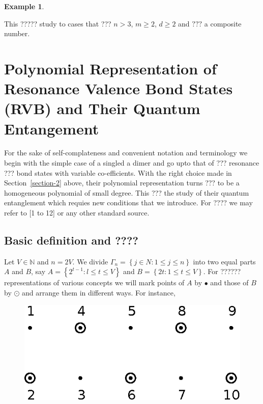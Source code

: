\documentclass[a4paper,12pt]{article}
\theoremstyle{definition}
\theoremstyle{underlinethm}
\newtheorem{example}{Example}[section]
\theoremstyle{definition}
\begin{document}
\begin{example}
\begin{enumerate}[label=(\roman*)]
 \end{enumerate}
 This ????? study to cases that ??? $n > 3$, $m \geq 2$, $d \geq 2$ and $???$ a composite number.
\end{example} 

\section{Polynomial Representation of Resonance Valence Bond States (RVB) and Their Quantum Entangement}\label{section-3}

For the sake of self-complateness and convenient notation and terminology we begin with the simple case of a singled a dimer and go upto that of ??? resonance ??? bond states with variable co-efficients. With the right choice made in Section~\eqref{section-2} above, their polynomial representation turns ??? to be a homogeneous polynomial of small degree. This ??? the study of their quantum entanglement which requies new conditions that we introduce. For ???? we may refer to [1 to  12] or any other standard source.

\subsection{Basic definition and ????}\label{subsection-3.1}

Let $V \in \mathbb{N}$ and $n=2V$. We divide $\Gamma_{n} = \left\{j \in N : 1 \leq j \leq n\right\}$ into two equal parts $A$ and $B$, say $A = \left\{2^{t-1} : l \leq t \leq V\right\}$ and $B = \left\{ 2t : 1 \leq t \leq V \right\}$. For ?????? representations of various concepts we will mark points of $A$ by $\bullet$ and those of $B$ by $\odot$ and arrange them in different ways. For instance,

\begin{figure}
\centering
\includegraphics[scale=.8]{figure/fig2.eps}
\caption{}\label{fig02}
\end{figure}
\end{document}
